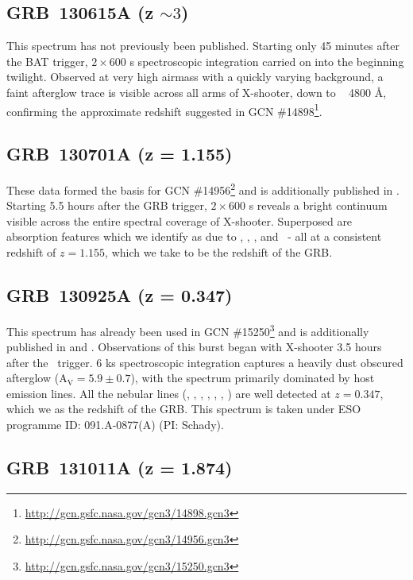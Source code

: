 \documentclass{aa}    %
\begin{document}
\subsection{GRB~130615A (z $\sim 3$)}

This spectrum has not previously been published. Starting only 45 minutes after
the BAT trigger, $2\times600$ s spectroscopic integration carried on into the
beginning twilight. Observed at very high airmass with a quickly varying
background, a faint afterglow trace is visible across all arms of X-shooter,
down to ~ 4800 \AA, confirming the approximate redshift suggested in GCN
\#14898\footnote{\url{http://gcn.gsfc.nasa.gov/gcn3/14898.gcn3}}.


\subsection{GRB~130701A (z = 1.155)}	

These data formed the basis for GCN
\#14956\footnote{\url{http://gcn.gsfc.nasa.gov/gcn3/14956.gcn3}} and is
additionally published in \citet{Kruhler2015}. Starting 5.5 hours after the GRB
trigger, $2\times600$ s reveals a bright continuum visible across the entire
spectral coverage of X-shooter. Superposed are absorption features which we
identify as due to \feii, \mgii, \mgi, and \caii~- all at a consistent redshift
of $z = 1.155$, which we take to be the redshift of the GRB.



\subsection{GRB~130925A (z = 0.347)}

This spectrum has already been used in GCN
\#15250\footnote{\url{http://gcn.gsfc.nasa.gov/gcn3/15250.gcn3}} and is
additionally published in \citet{Schady2015} and \citet{Kruhler2015}.
Observations of this burst began with X-shooter 3.5 hours after the
\swift~trigger. 6 ks spectroscopic integration captures a heavily dust obscured
afterglow (A$_\mathrm{V} = 5.9 \pm 0.7$\citep{Greiner2014}), with the spectrum
primarily dominated by host emission lines. All the nebular lines (\oii, \hg,
\hb, \oii, \ha, \nii, \sii) are well detected at $z = 0.347$, which we as the
redshift of the GRB. This spectrum is taken under ESO programme ID:
091.A-0877(A) (PI: Schady).

\subsection{GRB~131011A (z = 1.874)}	
\end{document}
